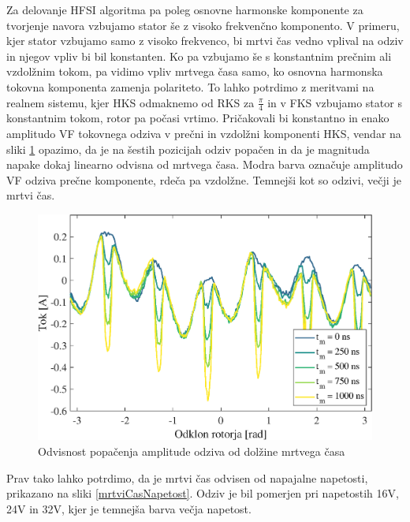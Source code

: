 \documentclass[a4paper,twoside,openright,12pt,slovene]{book}
\begin{document}
Za delovanje HFSI algoritma pa poleg osnovne harmonske komponente za tvorjenje navora vzbujamo stator še z visoko frekvenčno komponento. V primeru, kjer stator vzbujamo samo z visoko frekvenco, bi
mrtvi čas vedno vplival na odziv in njegov vpliv bi bil konstanten. Ko pa vzbujamo še s konstantnim prečnim ali vzdolžnim tokom, pa vidimo vpliv mrtvega časa samo, ko osnovna harmonska tokovna
komponenta zamenja polariteto. To lahko potrdimo z meritvami na realnem sistemu, kjer HKS odmaknemo od RKS za $\frac{\pi}{4}$ in v FKS vzbujamo stator s konstantnim tokom, rotor pa počasi vrtimo.
Pričakovali bi konstantno in enako amplitudo VF tokovnega odziva v prečni in vzdolžni komponenti HKS, vendar na sliki \ref{mrtviCas} opazimo, da je na šestih pozicijah odziv popačen in da je magnituda
napake dokaj linearno odvisna od mrtvega časa. Modra barva označuje amplitudo VF odziva prečne komponente, rdeča pa vzdolžne. Temnejši kot so odzivi, večji je mrtvi čas. 

\begin{figure}[!htbp]
    \centering
    \includegraphics[width=0.95\columnwidth]{Slike/mrtviCas.eps}
    \caption{\label{mrtviCas} Odvisnost popačenja amplitude odziva od dolžine mrtvega časa}
\end{figure}

Prav tako lahko potrdimo, da je mrtvi čas odvisen od napajalne napetosti, prikazano na sliki \ref{mrtviCasNapetost}. Odziv je bil pomerjen pri napetostih 16V, 24V in 32V, kjer je temnejša barva večja
napetost.
\end{document}
